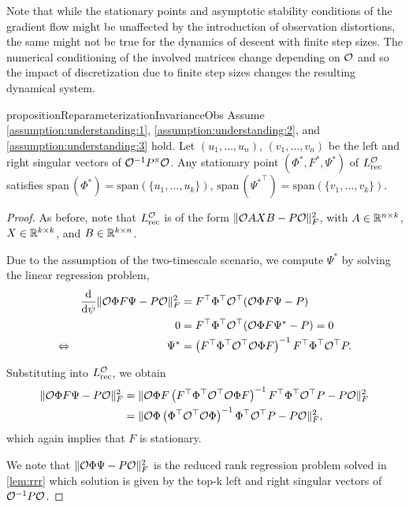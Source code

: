 Note that while the stationary points and asymptotic stability conditions of the gradient flow might be unaffected by the introduction of observation distortions, the same might not be true for the dynamics of descent with finite step sizes.
The numerical conditioning of the involved matrices change depending on ${\mathcal{O}}$ and so the impact of discretization due to finite step sizes changes the resulting dynamical system.

\begin{restatable}{proposition}{ReparameterizationInvarianceObs} 
 Assume \autoref{assumption:understanding:1}, \autoref{assumption:understanding:2}, and \autoref{assumption:understanding:3} hold. Let $(u_1,\dots,u_n)$, $(v_1,\dots,v_n)$ be the left and right singular vectors of ${\mathcal{O}}^{-1}P^\pi{\mathcal{O}}$. 
Any stationary point $(\Phi^*, F^*, \Psi^*)$ of $L_\text{rec}^{\mathcal{O}}$ satisfies $\mathrm{span}\,(\Phi^*)=\mathrm{span}\left(\{u_1,\dots,u_k\}\right)$, $\mathrm{span}\,({\Psi^*}^\top)=\mathrm{span}\left(\{v_1,\dots,v_k\}\right)$.
\end{restatable}
\begin{proof}
    
As before, note that $L_\mathrm{rec}^{\mathcal{O}}$ is of the form $\lVert {\mathcal{O}} AXB - P{\mathcal{O}} \rVert_F^2$, with $A \in \mathbb{R}^{n \times k}$, $X \in \mathbb{R}^{k \times k}$, and $B \in \mathbb{R}^{k \times n}$.

Due to the assumption of the two-timescale scenario, we compute $\Psi^*$ by solving the linear regression problem,
\begin{align*}
    &&\frac{\mathrm{d}}{\mathrm{d} \psi} \lVert {\mathcal{O}} \Phi F \Psi - P {\mathcal{O}} \rVert_F^2 &= F^\top \Phi^\top {\mathcal{O}}^\top ({\mathcal{O}} \Phi F \Psi - P)\\
    &&0 &=  F^\top \Phi^\top {\mathcal{O}}^\top ({\mathcal{O}} \Phi F \Psi^* - P) = 0 \\
    \Leftrightarrow &&
    \Psi^* &= \left(F^\top \Phi^\top {\mathcal{O}}^\top {\mathcal{O}} \Phi F\right)^{-1} F^\top \Phi^\top {\mathcal{O}}^\top P.
\end{align*}

Substituting into $L_\mathrm{rec}^{\mathcal{O}}$, we obtain
\begin{align*}
    \lVert {\mathcal{O}} \Phi F \Psi- P {\mathcal{O}} \rVert_F^2 & = \lVert {\mathcal{O}} \Phi F \left(F^\top \Phi^\top {\mathcal{O}}^\top {\mathcal{O}} \Phi F\right)^{-1} F^\top \Phi^\top {\mathcal{O}}^\top P - P{\mathcal{O}} \rVert_F^2 \\
    & = \lVert {\mathcal{O}} \Phi \left( \Phi^\top {\mathcal{O}}^\top {\mathcal{O}} \Phi\right)^{-1} \Phi^\top {\mathcal{O}}^\top P - P{\mathcal{O}} \rVert_F^2,
\end{align*}
which again implies that $F$ is stationary.

We note that $\lVert {\mathcal{O}} \Phi\Psi - P{\mathcal{O}}\rVert^2_F$ is the reduced rank regression problem solved in \autoref{lem:rrr} which solution is given by the top-k left and right singular vectors of ${\mathcal{O}}^{-1} P {\mathcal{O}}$.
\end{proof}



